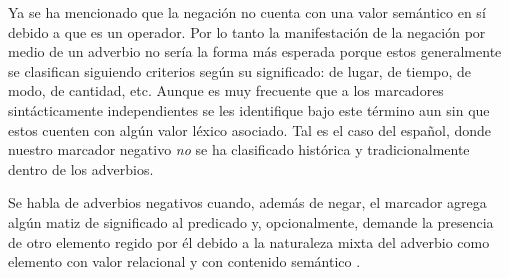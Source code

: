 Ya se ha mencionado que la negación no cuenta con una valor semántico en sí debido a que es un operador. Por lo tanto la manifestación de la negación por medio de un adverbio no sería la forma más esperada porque estos generalmente se clasifican siguiendo criterios según su significado: de lugar, de tiempo, de modo, de cantidad, etc. Aunque es muy frecuente que a los marcadores sintácticamente independientes se les identifique bajo este término aun sin que estos cuenten con algún valor léxico asociado. Tal es el caso del español, donde nuestro marcador negativo {\setmainfont{Charis SIL} \textit{no}} se ha clasificado histórica y tradicionalmente dentro de los adverbios.

Se habla de adverbios negativos cuando, además de negar, el marcador agrega algún matiz de significado al predicado y, opcionalmente, demande la presencia de otro elemento regido por él debido a la naturaleza mixta del adverbio como elemento con valor relacional y con contenido semántico \textcolor{MidnightBlue}{\citep{GiliGaya1973,PavonLucero2003}}.
